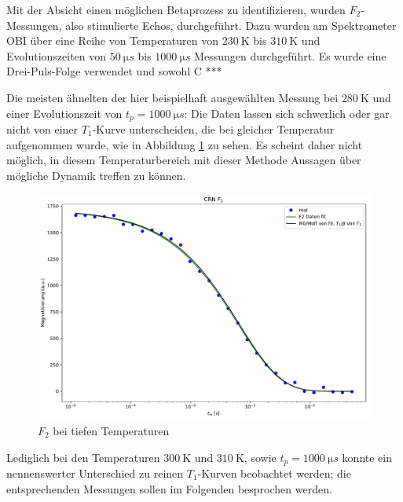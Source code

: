 Mit der Absicht einen möglichen Betaprozess zu identifizieren, wurden $F_2$-Messungen, also stimulierte Echos, durchgeführt. Dazu wurden am Spektrometer OBI über eine Reihe von Temperaturen von $\SI{230}{\kelvin}$ bis $\SI{310}{\kelvin}$ und Evolutionszeiten von $\SI{50}{\micro s}$ bis $\SI{1000}{\micro s}$ Messungen durchgeführt. Es wurde eine Drei-Puls-Folge verwendet und sowohl C ***

Die meisten ähnelten der hier beispielhaft ausgewählten Messung bei $\SI{280}{\kelvin}$ und einer Evolutionszeit von $t_p = \SI{1000}{\micro s}$: Die Daten lassen sich schwerlich oder gar nicht von einer $T_1$-Kurve unterscheiden, die bei gleicher Temperatur aufgenommen wurde, wie in Abbildung \ref{fig:res:F_2_tieftemp} zu sehen. Es scheint daher nicht möglich, in diesem Temperaturbereich mit dieser Methode Aussagen über mögliche Dynamik treffen zu können.
\begin{figure}
	\begin{center}
		\includegraphics[width=\textwidth]{graphics/plots/F2/f2_tieftemp.pdf}
	\end{center}
	\caption{$F_2$ bei tiefen Temperaturen} \label{fig:res:F_2_tieftemp}
\end{figure}

Lediglich bei den Temperaturen $\SI{300}{\kelvin}$ und $\SI{310}{\kelvin}$, sowie $t_p = \SI{1000}{\micro s}$ konnte ein nennenswerter Unterschied zu reinen $T_1$-Kurven beobachtet werden; die entsprechenden Messungen sollen im Folgenden besprochen werden.

